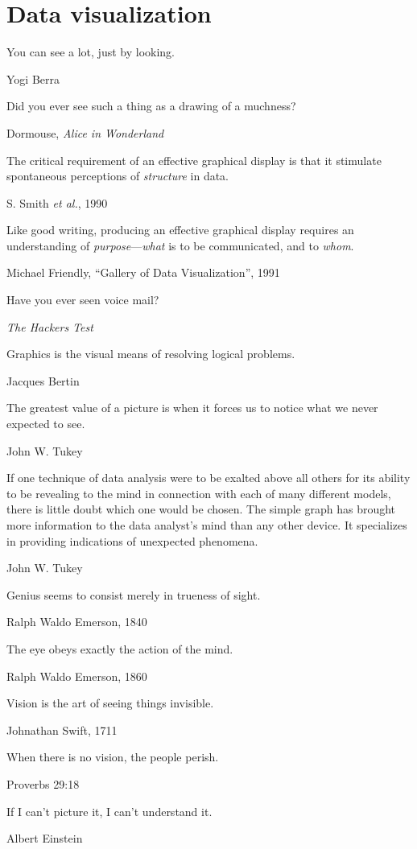 
\section{Data visualization}

\epigraph{You can see a lot, just by looking.}{Yogi Berra}

\epigraph{Did you ever see such a thing as a drawing of a muchness?}{Dormouse, \emph{Alice in Wonderland}}

\epigraph{The critical requirement of an effective graphical display is that it stimulate spontaneous perceptions of \emph{structure} in data.}{S. Smith \emph{et al.}, 1990}

\epigraph{Like good writing, producing an effective graphical display requires an understanding of \emph{purpose}---\emph{what} is to be communicated, and to \emph{whom}.}{Michael Friendly, ``Gallery of Data Visualization'', 1991}

\epigraph{Have you ever seen voice mail?}{\emph{The Hackers Test}}

\epigraph{Graphics is the visual means of resolving logical problems.}{Jacques Bertin \citet[p. 16]{Bertin:81}}

\epigraph{The greatest value of a picture is when it forces us to notice what we never expected to see.}{John W. Tukey \citet[p. vi]{Tukey:77}}

\epigraph{If one technique of data analysis were to be exalted above all others for its ability to be revealing to the mind in connection with each of many different models, there is little doubt which one would be chosen. The simple graph has brought more information to the data analyst's mind than any other device. It specializes in providing indications of unexpected phenomena.}{John W. Tukey \citet[p. 49]{Tukey:1962}}
 
\epigraph{Genius seems to consist merely in trueness of sight.}{Ralph Waldo Emerson, 1840}

\epigraph{The eye obeys exactly the action of the mind.}{Ralph Waldo Emerson, 1860}

\epigraph{Vision is the art of seeing things invisible.}{Johnathan Swift, 1711}

\epigraph{When there is no vision, the people perish.}{Proverbs 29:18}

\epigraph{If I can't picture it, I can't understand it.}{Albert Einstein}

